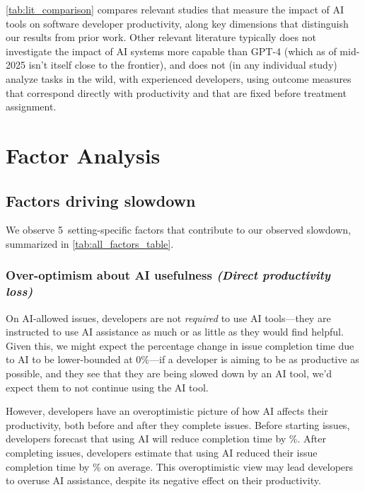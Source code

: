 \documentclass{article}
\newcommand{\NumFactorsThatLikelyContribute}{5}
\begin{document}
\autoref{tab:lit_comparison} compares relevant studies that measure the impact of AI tools on software developer productivity, along key dimensions that distinguish our results from prior work. Other relevant literature typically does not investigate the impact of AI systems more capable than GPT-4 (which as of mid-2025 isn't itself close to the frontier), and does not (in any individual study) analyze tasks in the wild, with experienced developers, using outcome measures that correspond directly with productivity and that are fixed before treatment assignment.


\section{Factor Analysis}
\label{sec:allfactors}

\subsection{Factors driving slowdown}
\label{sec:factorsdriving}

We observe \NumFactorsThatLikelyContribute\ setting-specific factors that contribute to our observed slowdown, summarized in \autoref{tab:all_factors_table}.


\subsubsection{Over-optimism about AI usefulness \textnormal{\textit{(Direct productivity loss)}}}
\label{sec:factor-over-optimistic-beliefs-about-ai-usefulness}

On AI-allowed issues, developers are not \textit{required} to use AI tools---they are instructed to use AI assistance as much or as little as they would find helpful. Given this, we might expect the percentage change in issue completion time due to AI to be lower-bounded at 0\%---if a developer is aiming to be as productive as possible, and they see that they are being slowed down by an AI tool, we'd expect them to not continue using the AI tool.

However, developers have an overoptimistic picture of how AI affects their productivity, both before and after they complete issues. Before starting issues, developers forecast that using AI will reduce completion time by \PctSpeedupForecastAbsValue \%. After completing issues, developers estimate that using AI reduced their issue completion time by \PctSpeedupBackcastAbsValue \% on average. This overoptimistic view may lead developers to overuse AI assistance, despite its negative effect on their productivity.
\end{document}

